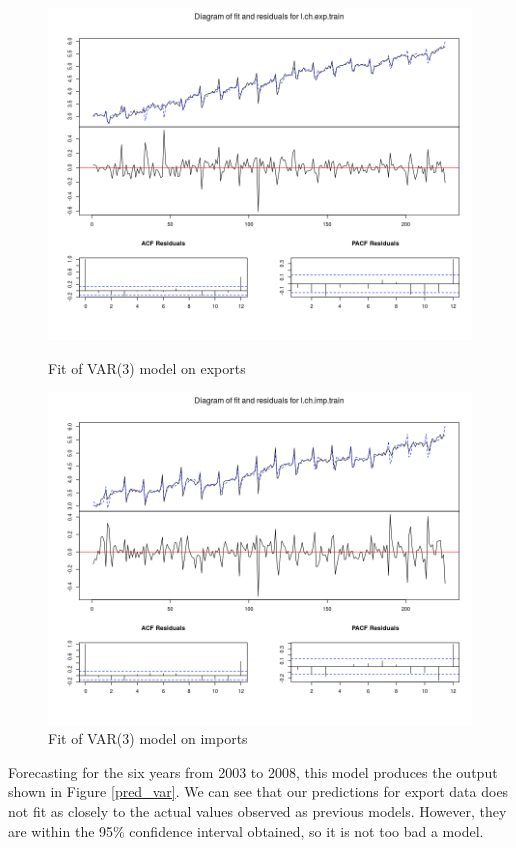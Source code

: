\documentclass[]{article}
\begin{document}
\begin{figure}[!ht]
\centering
\begin{minipage}{.5\textwidth}
\centering
\includegraphics[width=\linewidth]{fit_var_exp}
\caption{Fit of VAR(3) model on exports}
\label{fit_var_exp}
\end{minipage}%
\begin{minipage}{.5\textwidth}
\centering
\includegraphics[width=\linewidth]{fit_var_imp}
\caption{Fit of VAR(3) model on imports}
\label{fit_var_imp}
\end{minipage}
\end{figure}

Forecasting for the six years from 2003 to 2008, this model produces the output shown in Figure \ref{pred_var}. We can see that our predictions for export data does not fit as closely to the actual values observed as previous models. However, they are within the 95\% confidence interval obtained, so it is not too bad a model.
\end{document}
